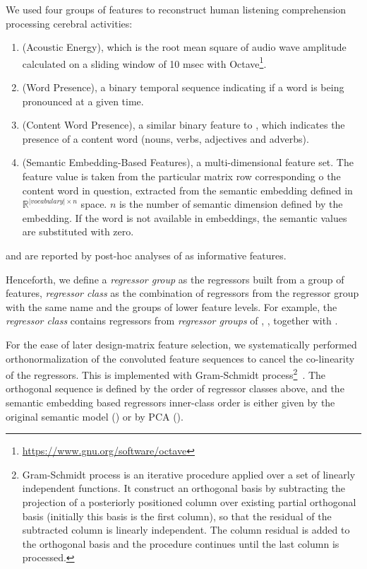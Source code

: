 We used four groups of features to reconstruct human listening comprehension processing cerebral activities:
\begin{enumerate}
	\item {} (Acoustic Energy), which is the root mean square of audio wave amplitude calculated on a sliding window of 10 msec with Octave\footnote{\url{https://www.gnu.org/software/octave}}.
	\item {} (Word Presence), a binary temporal sequence indicating if a word is being pronounced at a given time.
	\item {} (Content Word Presence), a similar binary feature to , which indicates the presence of a content word (nouns, verbs, adjectives and adverbs). 
	\item {} (Semantic Embedding-Based Features), a multi-dimensional feature set. The feature value is taken from the particular matrix row corresponding o the content word in question, extracted from the semantic embedding defined in \(\mathbb{R}^{\vert vocabulary \vert \times n}\) space. \(n\) is the number of semantic dimension defined by the embedding. If the word is not available in embeddings, the semantic values are substituted with zero.
\end{enumerate}

 and  are reported by post-hoc analyses of \textcite{todorovicAnalysesIRMfLors2018} as informative features. 

Henceforth, we define a \emph{regressor group} as the regressors built from a group of features, \emph{regressor class} as the combination of regressors from the regressor group with the same name and the groups of lower feature levels. For example, the \emph{regressor class}  contains regressors from \emph{regressor groups} of , , together with .

For the ease of later design-matrix feature selection, we systematically performed orthonormalization of the convoluted feature sequences to cancel the co-linearity of the regressors. This is implemented with Gram-Schmidt process\footnote{Gram-Schmidt process is an iterative procedure applied over a set of linearly independent functions. It construct an orthogonal basis by subtracting the projection of a posteriorly positioned column over existing partial orthogonal basis (initially this basis is the first column), so that the residual of the subtracted column is linearly independent. The column residual is added to the orthogonal basis and the procedure continues until the last column is processed.}~\parencite{GramSchmidtProcess2019}. The orthogonal sequence is defined by the order of regressor classes above, and the semantic embedding based regressors inner-class order is either given by the original semantic model () or by PCA (). 

